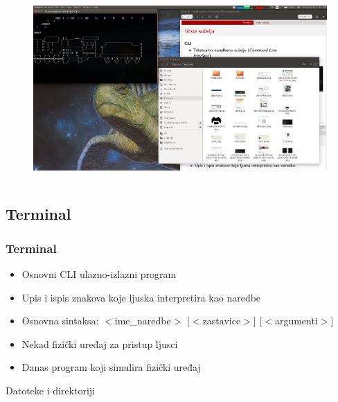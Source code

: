 \documentclass{beamer}
\begin{document}
\begin{frame}[t]
\begin{columns}
\begin{column}{.3\textwidth}
\begin{figure}[t]
        \begin{minipage}{\textwidth}
          \centering
          \includegraphics[width=\linewidth]{gui.png}
        \end{minipage}
      \end{figure}
    \end{column}
  \end{columns}
\end{frame}

\subsection{Terminal}
\begin{frame}[t]
\frametitle{Terminal}
  \begin{itemize}
    \setlength\itemsep{1em}
    \item Osnovni CLI ulazno-izlazni program
    \item Upis i ispis znakova koje ljuska interpretira kao naredbe
    \item Osnovna sintaksa: $<$ime\_naredbe$>$ [$<$zastavice$>$] [$<$argumenti$>$]
  \end{itemize}
  
  \vfill
  \begin{footnotesize}
    \begin{itemize}
      \item Nekad fizički uređaj za pristup ljusci
      \item Danas program koji simulira fizički uređaj
    \end{itemize}
  \end{footnotesize}  
\end{frame}

\begin{frame}[c]
  \begin{center}
    \begin{Huge}
      Datoteke i direktoriji
    \end{Huge}
  \end{center}
\end{frame}
\end{document}

